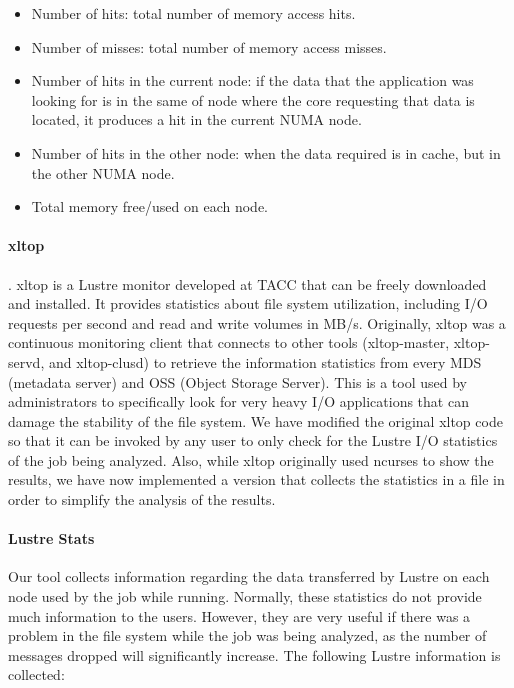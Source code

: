 \documentclass[10pt,a4paper]{report}
\begin{document}
\begin{itemize}
	\item Number of hits: total number of memory access hits. 
	\item Number of misses: total number of memory access misses. 
	\item Number of hits in the current node: if the data that the application was looking for is in the same of node where the core requesting that data is located, it produces a hit in the current NUMA node.
	\item Number of hits in the other node: when the data required is in cache, but in the other NUMA node.
	\item Total memory free/used on each node.
\end{itemize}


\paragraph{xltop} \cite{xltop}. xltop is a Lustre monitor developed at TACC that can be freely downloaded and installed. It provides statistics about file system utilization, including I/O requests per second and read and write volumes in MB/s. Originally, xltop was a continuous monitoring client that connects to other tools (xltop-master, xltop-servd, and xltop-clusd) to retrieve the information statistics from every MDS (metadata server) and OSS (Object Storage Server). This is a tool used by administrators to specifically look for very heavy I/O applications that can damage the stability of the file system. We have modified the original xltop code so that it can be invoked by any user to only check for the Lustre I/O statistics of the job being analyzed. Also, while xltop originally used ncurses to show the results, we have now implemented a version that collects the statistics in a file in order to simplify the analysis of the results.

\paragraph{Lustre Stats}
Our tool collects information regarding the data transferred by Lustre on each node used by the job while running. Normally, these statistics do not provide much information to the users. However, they are very useful if there was a problem in the file system while the job was being analyzed, as the number of messages dropped will significantly increase. The following Lustre information is collected:
\end{document}
